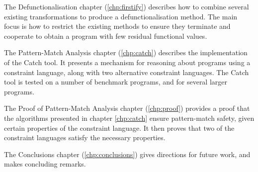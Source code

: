 The Defunctionalisation chapter (\ref{chp:firstify}) describes how to combine several existing transformations to produce a defunctionalisation method. The main focus is how to restrict the existing methods to ensure they terminate and cooperate to obtain a program with few residual functional values.

The Pattern-Match Analysis chapter (\ref{chp:catch}) describes the implementation of the Catch tool. It presents a mechanism for reasoning about programs using a constraint language, along with two alternative constraint languages. The Catch tool is tested on a number of benchmark programs, and for several larger programs.

The Proof of Pattern-Match Analysis chapter (\ref{chp:proof}) provides a proof that the algorithms presented in chapter \ref{chp:catch} ensure pattern-match safety, given certain properties of the constraint language. It then proves that two of the constraint languages satisfy the necessary properties.

The Conclusions chapter (\ref{chp:conclusions}) gives directions for future work, and makes concluding remarks.

